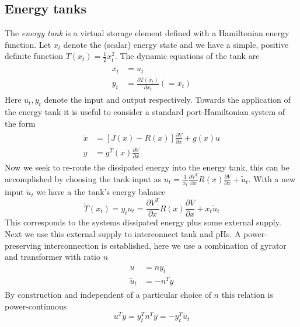 \documentclass[a4paper,twoside, openright,12pt]{report}
\begin{document}
\subsection{Energy tanks}   
The \emph{energy tank} is a virtual storage element defined with a Hamiltonian energy function. Let $x_t$ denote the (scalar) energy state and we have a simple, positive definite function $T(x_t) = \frac{1}{2}x_t^2$. The dynamic equations of the tank are
\begin{eqnarray}
\begin{aligned}
\dot{x_t} &= u_t \\
y_t &= \frac{\partial T(x_t)}{\partial x_t} (=x_t)
\end{aligned}
\end{eqnarray}
Here $u_t,y_t$ denote the input and output respectively. Towards the application of the energy tank it is useful to consider a standard port-Hamiltonian system of the form
\begin{eqnarray}
\begin{aligned}
\dot{x} &= [J(x) - R(x)] \frac{\partial V}{\partial x} + g(x)u \\
y &= g^T(x) \frac{\partial V}{\partial x}
\end{aligned}
\end{eqnarray}
Now we seek to re-route the dissipated energy into the energy tank, this can be accomplished by choosing the tank input as $u_t = \frac{1}{x_t}\frac{\partial V^T}{\partial x}R(x)\frac{\partial V}{\partial x} + \tilde{u}_t$. With a new input $\tilde{u}_t$ we have a the tank's energy balance
\begin{equation}
\dot{T}(x_t)=y_tu_t = \frac{\partial V^T}{\partial x}R(x)\frac{\partial V}{\partial x} + x_t\tilde{u}_t
\end{equation}
This corresponds to the systems dissipated energy plus some external supply. Next we use this external supply to interconnect tank and pHs. A power-preserving interconnection is established, here we use a combination of gyrator and transformer with ratio $n$
\begin{eqnarray}
\begin{aligned}
u &= ny_t \\
\tilde{u}_t &= -n^Ty
\end{aligned}
\end{eqnarray}
By construction and independent of a particular choice of $n$ this relation is power-continuous
\begin{equation}
u^Ty = y_t^Tn^Ty = -y_t^T\tilde{u}_t
\end{equation}
\end{document}
